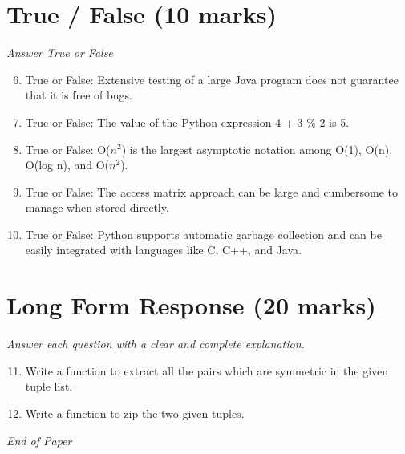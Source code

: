 \documentclass[12pt]{article}
\begin{document}
\section*{True / False (10 marks)}
\textit{Answer True or False}
\begin{enumerate}[label=\arabic*.]
\setcounter{enumi}{5}
\item True or False: Extensive testing of a large Java program does not guarantee that it is free of bugs.
\item True or False: The value of the Python expression 4 + 3 \% 2 is 5.
\item True or False: O($n^2$) is the largest asymptotic notation among O(1), O(n), O(log n), and O($n^2$).
\item True or False: The access matrix approach can be large and cumbersome to manage when stored directly.
\item True or False: Python supports automatic garbage collection and can be easily integrated with languages like C, C++, and Java.
\end{enumerate}

\section*{Long Form Response (20 marks)}
\textit{Answer each question with a clear and complete explanation.}
\begin{enumerate}[label=\arabic*.]
\setcounter{enumi}{10}
\item Write a function to extract all the pairs which are symmetric in the given tuple list.
\item Write a function to zip the two given tuples.
\end{enumerate}

\vfill
\noindent\textit{End of Paper}
\end{document}

